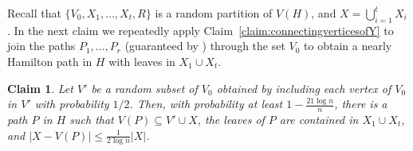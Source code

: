 \documentclass[10pt]{article}
\theoremstyle{plain}
\numberwithin{theorem}{section}
\newtheorem{claim}{Claim}[theorem]
\theoremstyle{definition}
\theoremstyle{remark}
\theoremstyle{plain}
\begin{document}
    Recall that $\{V_0, X_1, \ldots, X_t, R\}$ is a random partition of $V(H)$, and $X = \bigcup_{i = 1}^t X_i$. In the next claim we repeatedly apply Claim~\ref{claim:connectingverticesofY} to join the paths $P_1, \ldots, P_r$ (guaranteed by )  through the set $V_0$ to obtain a nearly Hamilton path in $H$ with leaves in $X_1 \cup X_t$.
 
	\begin{claim}
		\label{claim:almostspanningpath}
		Let $V'$ be a random subset of $V_0$ obtained by including each vertex of $V_0$ in $V'$ with probability $1/2$. 
		Then, with probability at least $1 - \frac{21 \log n}{n}$, there is a path $P$ in $H$ such that $V(P) \subseteq V' \cup X$, the leaves of $P$ are contained in $X_1 \cup X_t$, and $|X - V(P)| \le \frac{1}{2\log n}|X|$. 
	\end{claim}
\end{document}
